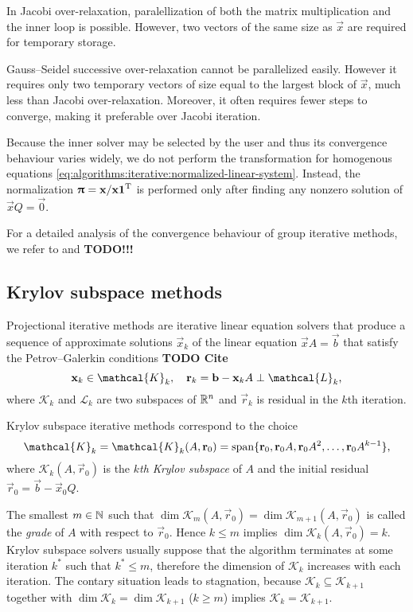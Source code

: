 In Jacobi over-relaxation, paralellization of both the matrix
multiplication and the inner loop is possible. However, two vectors of
the same size as $\vec{x}$ are required for temporary storage.

Gauss--Seidel successive over-relaxation cannot be parallelized
easily.  However it requires only two temporary vectors of size equal
to the largest block of $\vec{x}$, much less than Jacobi
over-relaxation. Moreover, it often requires fewer steps to converge,
making it preferable over Jacobi iteration.

Because the inner solver may be selected by the user and thus its
convergence behaviour varies widely, we do not perform the
transformation for homogenous equations
\eqref{eq:algorithms:iterative:normalized-linear-system}. Instead, the
normalization $\bm{\mathrm{\uppi}} = \bm{\mathrm{x}} / \bm{\mathrm{x}}\bm{\mathrm{1}}^{\mathrm{T}}$ is performed
only after finding any nonzero solution of $\vec{x} Q = \vec{0}$.

For a detailed analysis of the convergence behaviour of group
iterative methods, we refer to
\citet[Chapter~14]{greenbaum1997iterative} and \citet{} \textbf{TODO!!!}

\subsection{Krylov subspace methods}

Projectional iterative methods are iterative linear equation solvers
that produce a sequence of approximate solutions $\vec{x}_k$ of the
linear equation $\vec{x} A = \vec{b}$ that satisfy the
Petrov--Galerkin conditions \textbf{TODO Cite}
\begin{equation}
  \label{eq:algorithms:krylov:galerkin}
  \vec{x}_k \in \mathcal{K}_k, \quad \vec{r}_k = \vec{b} - \vec{x}_k A
  \perp \mathcal{L}_k \text,
\end{equation}
where $\mathcal{K}_k$ and $\mathcal{L}_k$ are two subspaces of
$\mathbb{R}^n$ and $\vec{r}_k$ is residual in the $k$th iteration.

Krylov subspace iterative methods correspond to the choice
\begin{equation}
  \mathcal{K}_k = \mathcal{K}_{k}(A, \vec{r}_0) = \Span \{ \vec{r}_0,
  \vec{r}_0 A, \vec{r}_0 A^2, \ldots, \vec{r}_0 A^{k - 1} \} \text,
\end{equation}
where $\mathcal{K}_{k}(A, \vec{r}_0)$ is the \emph{$k$th Krylov
  subspace} of $A$ and the initial residual $\vec{r}_0 = \vec{b} -
\vec{x}_0 Q$.

The smallest $m \in \mathbb{N}$ such that
$\dim \mathcal{K}_m(A, \vec{r}_0) = \dim \mathcal{K}_{m + 1}(A,
\vec{r}_0)$
is called the \emph{grade} of $A$ with respect to $\vec{r}_0$. Hence
$k \le m$ implies $\dim \mathcal{K}_k(A, \vec{r}_0) = k$. Krylov
subspace solvers usually suppose that the algorithm terminates at some
iteration $k^*$ such that $k^* \le m$, therefore the dimension of
$\mathcal{K}_k$ increases with each iteration. The contary situation
leads to stagnation, because
$\mathcal{K}_k \subseteq \mathcal{K}_{k + 1}$ together with
$\dim \mathcal{K}_k = \dim \mathcal{K}_{k + 1}$ ($k \ge m$) implies
$\mathcal{K}_k = \mathcal{K}_{k + 1}$.

